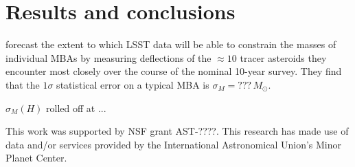 \documentclass[linenumbers, onecolumn]{aastex631}
\begin{document}
\section{Results and conclusions}
\label{sec:results}

\citet{negin} forecast the extent to which LSST data will be able to
constrain the masses of individual MBAs by measuring deflections of
the $\approx 10$ tracer asteroids they encounter most closely over the
course of the nominal 10-year survey.  They find that the $1\sigma$
statistical error on a typical MBA is $\sigma_M=???\, M_\odot.$

$\sigma_M(H)$ rolled off at ...

\begin{acknowledgments}
  This work was supported by NSF grant AST-????.
  This research has made use of data and/or services provided by the International Astronomical Union's Minor Planet Center. 
\end{acknowledgments}

\newpage

%
\end{document}
